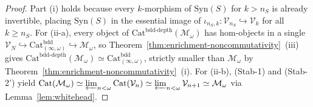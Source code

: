 \documentclass[11pt]{article}
\theoremstyle{plain}
\theoremstyle{definition}
\newcommand{\Cat}{\mathrm{Cat}}
\newcommand{\Syn}{\mathrm{Syn}}
\begin{document}
\begin{proof}
Part (i) holds because every $k$-morphism of $\Syn(S)$ for $k > n_S$ is already invertible, placing $\Syn(S)$ in the essential image of $\iota_{n_S, k} : \mathcal{V}_{n_S} \hookrightarrow \mathcal{V}_k$ for all $k \ge n_S$. For (ii-a), every object of $\Cat^{\mathrm{bdd\text{-}depth}}(\mathcal{M}_\omega)$ has hom-objects in a single $\mathcal{V}_N \hookrightarrow \Cat_{(\infty,\omega)}^{\mathrm{bdd}} \hookrightarrow \mathcal{M}_\omega$, so Theorem~\ref{thm:enrichment-noncommutativity}~(iii) gives $\Cat^{\mathrm{bdd\text{-}depth}}(\mathcal{M}_\omega) \simeq \Cat_{(\infty,\omega)}^{\mathrm{bdd}}$, strictly smaller than $\mathcal{M}_\omega$ by Theorem~\ref{thm:enrichment-noncommutativity}~(i). For (ii-b), \textup{(Stab-1)} and \textup{(Stab-2')} yield $\Cat(\mathcal{M}_\omega) \simeq \varprojlim_{n < \omega} \Cat(\mathcal{V}_n) \simeq \varprojlim_{n < \omega} \mathcal{V}_{n+1} \simeq \mathcal{M}_\omega$ via Lemma~\ref{lem:whitehead}.
\end{proof}
\end{document}
